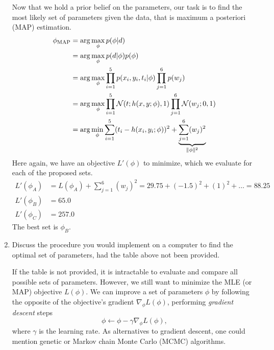 \documentclass[11pt, a4paper]{article}
\begin{document}
\begin{enumerate}
    \begin{solution}
        Now that we hold a prior belief on the parameters, our task is to find the most likely set of parameters given the data, that is maximum a posteriori (MAP) estimation.
        \begin{align*}
            \phi_{\text{MAP}} & = \arg\max_\phi p(\phi | d) \\
            & = \arg\max_\phi p(d | \phi) p(\phi) \\
            & = \arg\max_\phi \prod_{i=1}^5 p(x_i, y_i, t_i | \phi) \prod_{j=1}^6 p(w_j) \\
            & = \arg\max_\phi \prod_{i=1}^5 \mathcal{N}(t; h(x, y; \phi), 1) \prod_{j=1}^6 \mathcal{N}(w_j; 0, 1) \\
            & = \arg\min_\phi \sum_{i=1}^5 (t_i - h(x_i, y_i; \phi))^2 + \underbrace{\sum_{j=1}^6 (w_j)^2}_{\lVert\phi\rVert^2}
        \end{align*}
        Here again, we have an objective $L'(\phi)$ to minimize, which we evaluate for each of the proposed sets.
        \begin{align*}
            L'(\phi_A) & = L(\phi_A) + \sum_{j=1}^6 (w_j)^2 = 29.75 + (-1.5)^2 + (1)^2 + \dots = 88.25 \\
            L'(\phi_B) & = 65.0 \\
            L'(\phi_C) & = 257.0
        \end{align*}
        The best set is $\phi_B$.
    \end{solution}

    \item Discuss the procedure you would implement on a computer to find the optimal set of parameters, had the table above not been provided.

    \begin{solution}
        If the table is not provided, it is intractable to evaluate and compare all possible sets of parameters. However, we still want to minimize the MLE (or MAP) objective $L(\phi)$. We can improve a set of parameters $\phi$ by following the opposite of the objective's gradient $\nabla_{\! \phi} L(\phi)$, \ie{} performing \emph{gradient descent} steps
        \begin{equation*}
            \phi \gets \phi - \gamma \nabla_{\! \phi} L(\phi) ,
        \end{equation*}
        where $\gamma$ is the learning rate. As alternatives to gradient descent, one could mention genetic or Markov chain Monte Carlo (MCMC) algorithms.
    \end{solution}


\end{enumerate}
\end{document}
